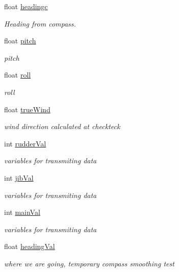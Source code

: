 \begin{DoxyCompactItemize}
float \hyperlink{group__group1_ga4736792191ccbbbb7b3d6933a3302336}{headingc}
\begin{DoxyCompactList}\small\item\em \-Heading from compass. \end{DoxyCompactList}\item 
float \hyperlink{group__group1_ga282e7d4378d4a18a805b8980295ac86c}{pitch}
\begin{DoxyCompactList}\small\item\em pitch \end{DoxyCompactList}\item 
float \hyperlink{group__group1_ga26fd84d522945b6038221d9e38c7cc39}{roll}
\begin{DoxyCompactList}\small\item\em roll \end{DoxyCompactList}\item 
float \hyperlink{group__group1_gaea221e98c9a7c4e63325dc52ab83c14d}{true\-Wind}
\begin{DoxyCompactList}\small\item\em wind direction calculated at checkteck \end{DoxyCompactList}\item 
int \hyperlink{group__group1_ga8b212bdc5d94214c0e3803a696f2f676}{rudder\-Val}
\begin{DoxyCompactList}\small\item\em variables for transmiting data \end{DoxyCompactList}\item 
int \hyperlink{group__group1_ga1fee0a7eb4ae243dcc5afe20f508990e}{jib\-Val}
\begin{DoxyCompactList}\small\item\em variables for transmiting data \end{DoxyCompactList}\item 
int \hyperlink{group__group1_ga3c5dac52b53dc3642a843a7d6a9266ca}{main\-Val}
\begin{DoxyCompactList}\small\item\em variables for transmiting data \end{DoxyCompactList}\item 
float \hyperlink{group__group1_ga8d6cfa64e358c393d2d13c5a9803e052}{heading\-Val}
\begin{DoxyCompactList}\small\item\em where we are going, temporary compass smoothing test \end{DoxyCompactList}\item 

\end{DoxyCompactItemize}
